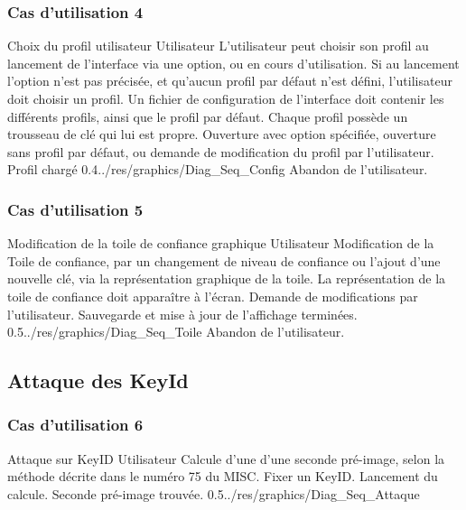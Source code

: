 \documentclass{../res/univ-projet}
\begin{document}
\subsubsection{Cas d'utilisation 4}
\ficheGraphic
{Choix du profil utilisateur}
{Utilisateur}
{L'utilisateur peut choisir son profil au lancement de l'interface via une option, ou en cours d'utilisation. Si au lancement l'option n'est pas précisée, 
et qu'aucun profil par défaut n'est défini, l'utilisateur doit choisir un profil.}
{Un fichier de configuration de l'interface doit contenir les différents profils, ainsi que le profil par défaut. 
Chaque profil possède un trousseau de clé qui lui est propre.}
{Ouverture avec option spécifiée, ouverture sans profil par défaut, ou demande de modification du profil par l'utilisateur.}
{Profil chargé}
{0.4}{../res/graphics/Diag_Seq_Config}
{Abandon de l'utilisateur.}
\vspace{0.5cm}

  \subsubsection{Cas d'utilisation 5}
\ficheGraphic
{Modification de la toile de confiance graphique}         
{Utilisateur}
{Modification de la Toile de confiance, par un changement de niveau de confiance ou l'ajout d'une nouvelle clé, via la représentation graphique de la toile.}
{La représentation de la toile de confiance doit apparaître à l'écran.}
{Demande de modifications par l'utilisateur.}
{Sauvegarde et mise à jour de l'affichage terminées.}
{0.5}{../res/graphics/Diag_Seq_Toile}
{Abandon de l'utilisateur.}                      
\vspace{0.5cm}
  

\subsection{Attaque des KeyId}
  
  \subsubsection{Cas d'utilisation 6}
\ficheGraphic
{Attaque sur KeyID}
{Utilisateur}
{Calcule d'une d'une seconde pré-image, selon la méthode décrite dans le numéro 75 du MISC.}
{Fixer un KeyID.}
{Lancement du calcule.}
{Seconde pré-image trouvée.}
{0.5}{../res/graphics/Diag_Seq_Attaque}
{}
\vspace{0.5cm}
  
\end{document}
